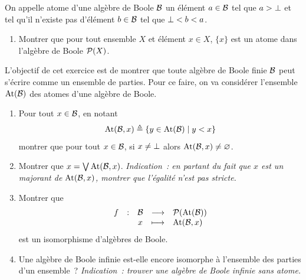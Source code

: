 \begin{exercise}
  On appelle atome d'une algèbre de Boole $\mathcal{B}$ un élément
  $a \in \mathcal{B}$ tel que $a > \bot$ et tel qu'il n'existe pas d'élément
  $b \in \mathcal{B}$ tel que $\bot < b < a$.
  \begin{enumerate}[label=(\roman*)]
  \item Montrer que pour tout ensemble $X$ et élément $x \in X$,
    $\{x\}$ est un atome dans l'algèbre de Boole $\mathcal{P}(X)$.
  \end{enumerate}

  \noindent
  L'objectif de cet exercice est de montrer que toute algèbre de Boole
  finie $\mathcal{B}$ peut s'écrire comme un ensemble de parties. Pour ce faire, on
  va considérer l'ensemble $\operatorname{At}(\mathcal{B})$ des atomes d'une algèbre de
  Boole.
  \begin{enumerate}[label=(\roman*),resume]
  \item Pour tout $x \in \mathcal{B}$, en notant
    \[\operatorname{At}(\mathcal{B},x) \triangleq \left\{ y \in \operatorname{At}(\mathcal{B}) \;\middle\vert\; y < x \right\}\]
    montrer que pour tout $x \in \mathcal{B}$, si $x \neq \bot$ alors
    $\operatorname{At}(\mathcal{B},x) \neq \varnothing$.
  \item Montrer que $x = \bigvee \operatorname{At}(\mathcal{B},x)$.
    \textit{Indication~: en partant du fait que $x$ est un majorant de
      $\operatorname{At}(\mathcal{B},x)$, montrer que l'égalité n'est pas stricte.}
  \item Montrer que
    \[
    \makeFun{f}{\varBB}{\powerset(\At(\varBB))}{x}{\At(\varBB,x)}
    \]
    est un isomorphisme d'algèbres de Boole.
  \item Une algèbre de Boole infinie est-elle encore isomorphe à
    l'ensemble des parties d'un ensemble~?
    \textit{Indication~: trouver une algèbre de Boole infinie sans
      atome.}
  \end{enumerate}
\end{exercise}

